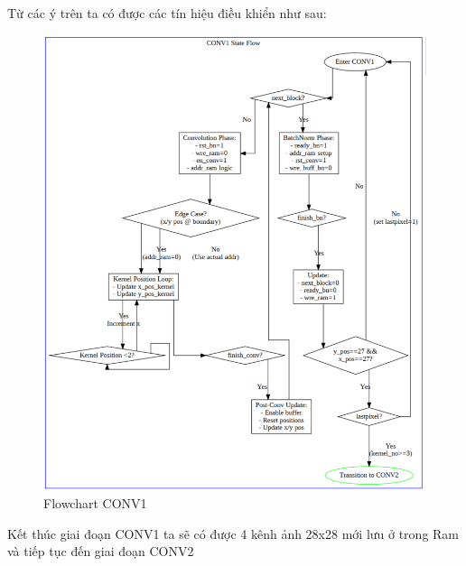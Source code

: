 Từ các ý trên ta có được các tín hiệu điều khiển như sau:


\begin{figure}[H]
    \centering
    \includegraphics[width=0.75\linewidth]{Images/conv1flow.png}
    \caption{Flowchart CONV1}
    \label{fig:enter-label}
\end{figure}

Kết thúc giai đoạn CONV1 ta sẽ có được 4 kênh ảnh 28x28 mới lưu ở trong Ram và tiếp tục đến giai đoạn CONV2

